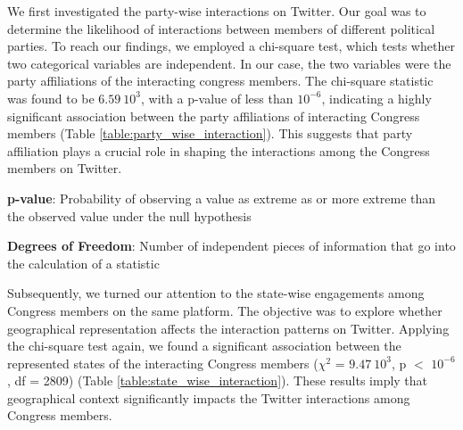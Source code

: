 \documentclass[11pt]{article}
\begin{document}
We first investigated the party-wise interactions on Twitter. Our goal was to determine the likelihood of interactions between members of different political parties. To reach our findings, we employed a chi-square test, which tests whether two categorical variables are independent. In our case, the two variables were the party affiliations of the interacting congress members. The chi-square statistic was found to be $6.59\ 10^{3}$, with a p-value of less than $10^{-6}$, indicating a highly significant association between the party affiliations of interacting Congress members (Table \ref{table:party_wise_interaction}). This suggests that party affiliation plays a crucial role in shaping the interactions among the Congress members on Twitter. 

\begin{table}[h]
\caption{Chi-square test of party-wise retweet interaction.}
\label{table:party_wise_interaction}
\begin{threeparttable}
\renewcommand{\TPTminimum}{\linewidth}
\begin{tablenotes}
\footnotesize
\item \textbf{p-value}: Probability of observing a value as extreme as or more extreme than the observed value under the null hypothesis
\item \textbf{Degrees of Freedom}: Number of independent pieces of information that go into the calculation of a statistic
\end{tablenotes}
\end{threeparttable}
\end{table}


Subsequently, we turned our attention to the state-wise engagements among Congress members on the same platform. The objective was to explore whether geographical representation affects the interaction patterns on Twitter. Applying the chi-square test again, we found a significant association between the represented states of the interacting Congress members ($\chi^2$ = $9.47\ 10^{3}$, p $<$ $10^{-6}$, df = 2809) (Table \ref{table:state_wise_interaction}). These results imply that geographical context significantly impacts the Twitter interactions among Congress members. 
\end{document}

